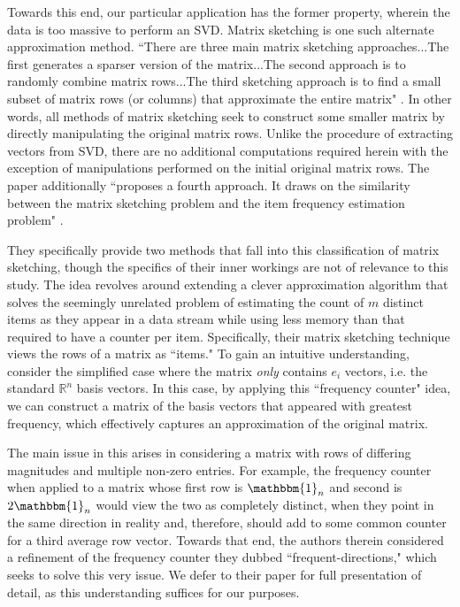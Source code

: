 \documentclass{article}
\begin{document}
Towards this end, our particular application has the former property, wherein the data is too massive to perform an SVD. Matrix sketching is one such alternate approximation method. ``There are three main matrix sketching approaches...The first generates a sparser version of the matrix...The second approach is to randomly combine matrix rows...The third sketching approach is to find a small subset of matrix rows (or columns) that approximate the entire matrix" \cite{sketch}. In other words, all methods of matrix sketching seek to construct some smaller matrix by directly manipulating the original matrix rows. Unlike the procedure of extracting vectors from SVD, there are no additional computations required herein with the exception of manipulations performed on the initial original matrix rows. The paper additionally ``proposes a fourth approach. It draws on the similarity between the matrix sketching problem and the item frequency estimation problem" \cite{sketch}.

They specifically provide two methods that fall into this classification of matrix sketching, though the specifics of their inner workings are not of relevance to this study. The idea revolves around extending a clever approximation algorithm that solves the seemingly unrelated problem of estimating the count of $m$ distinct items as they appear in a data stream while using less memory than that required to have a counter per item. Specifically, their matrix sketching technique views the rows of a matrix as ``items." To gain an intuitive understanding, consider the simplified case where the matrix \textit{only} contains $e_i$ vectors, i.e. the standard $\mathbb{R}^n$ basis vectors. In this case, by applying this ``frequency counter" idea, we can construct a matrix of the basis vectors that appeared with greatest frequency, which effectively captures an approximation of the original matrix.

The main issue in this arises in considering a matrix with rows of differing magnitudes and multiple non-zero entries. For example, the frequency counter when applied to a matrix whose first row is $\mathbbm{1}_n$ and second is $2\mathbbm{1}_n$ would view the two as completely distinct, when they point in the same direction in reality and, therefore, should add to some common counter for a third average row vector. Towards that end, the authors therein considered a refinement of the frequency counter they dubbed ``frequent-directions," which seeks to solve this very issue. We defer to their paper for full presentation of detail, as this understanding suffices for our purposes.
\end{document}
